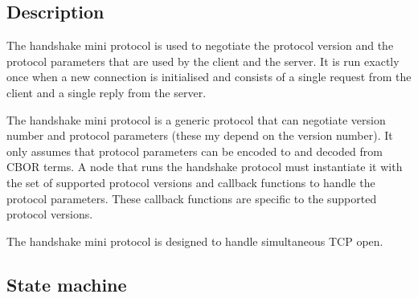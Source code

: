 \newcommand{\StPropose}{\state{StPropose}}
\newcommand{\StConfirm}{\state{StConfirm}}
\newcommand{\MsgProposeVersions}{\msg{MsgProposeVersions}}
\newcommand{\MsgReplyVersions}{\msg{MsgReplyVersions}}
\newcommand{\MsgAcceptVersion}{\msg{MsgAcceptVersion}}
\newcommand{\MsgQueryReply}{\msg{MsgQueryReply}}
\newcommand{\MsgRefuse}{\msg{MsgRefuse}}

\newcommand{\VersionMismatch}{\msg{VersionMismatch}}
\newcommand{\HandshakeDecodeError}{\msg{HandshakeDecodeError}}
\newcommand{\Refused}{\msg{Refused}}

\subsection{Description}
The handshake mini protocol is used to negotiate the protocol version
and the protocol parameters that are used by the client and the server.
It is run exactly once when a new connection is initialised
and consists of a single request from the client and a single reply from the server.

The handshake mini protocol is a generic protocol that can negotiate version number and protocol parameters (these my depend on the version number).
It only assumes that protocol parameters can be encoded to and decoded from CBOR terms.
A node that runs the handshake protocol must instantiate it with the set of
supported protocol versions and callback functions to handle the protocol parameters.
These callback functions are specific to the supported protocol versions.

The handshake mini protocol is designed to handle simultaneous TCP open.

\subsection{State machine}
\begin{figure}[h]
\end{figure}

